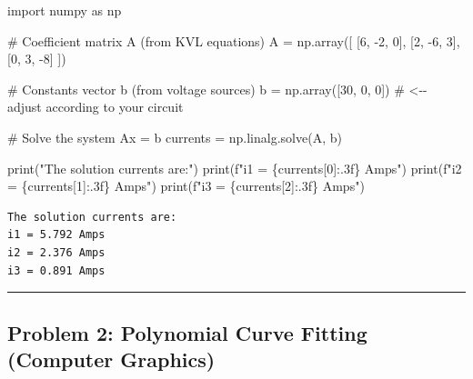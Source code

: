 \documentclass[
  letterpaper,
  DIV=11,
  numbers=noendperiod]{scrreprt}
\newenvironment{Shaded}{\begin{snugshade}}{\end{snugshade}}
\newcommand{\BuiltInTok}[1]{\textcolor[rgb]{0.00,0.23,0.31}{#1}}
\newcommand{\CommentTok}[1]{\textcolor[rgb]{0.37,0.37,0.37}{#1}}
\newcommand{\DecValTok}[1]{\textcolor[rgb]{0.68,0.00,0.00}{#1}}
\newcommand{\ImportTok}[1]{\textcolor[rgb]{0.00,0.46,0.62}{#1}}
\newcommand{\NormalTok}[1]{\textcolor[rgb]{0.00,0.23,0.31}{#1}}
\newcommand{\OperatorTok}[1]{\textcolor[rgb]{0.37,0.37,0.37}{#1}}
\newcommand{\SpecialCharTok}[1]{\textcolor[rgb]{0.37,0.37,0.37}{#1}}
\newcommand{\SpecialStringTok}[1]{\textcolor[rgb]{0.13,0.47,0.30}{#1}}
\newcommand{\StringTok}[1]{\textcolor[rgb]{0.13,0.47,0.30}{#1}}
\begin{document}
\label{solve-circuit}
\begin{Shaded}
\begin{Highlighting}[]
\ImportTok{import}\NormalTok{ numpy }\ImportTok{as}\NormalTok{ np}

\CommentTok{\# Coefficient matrix A (from KVL equations)}
\NormalTok{A }\OperatorTok{=}\NormalTok{ np.array([}
\NormalTok{    [}\DecValTok{6}\NormalTok{, }\OperatorTok{{-}}\DecValTok{2}\NormalTok{, }\DecValTok{0}\NormalTok{],}
\NormalTok{    [}\DecValTok{2}\NormalTok{, }\OperatorTok{{-}}\DecValTok{6}\NormalTok{, }\DecValTok{3}\NormalTok{],}
\NormalTok{    [}\DecValTok{0}\NormalTok{, }\DecValTok{3}\NormalTok{, }\OperatorTok{{-}}\DecValTok{8}\NormalTok{]}
\NormalTok{])}

\CommentTok{\# Constants vector b (from voltage sources)}
\NormalTok{b }\OperatorTok{=}\NormalTok{ np.array([}\DecValTok{30}\NormalTok{, }\DecValTok{0}\NormalTok{, }\DecValTok{0}\NormalTok{])   }\CommentTok{\# \textless{}{-}{-} adjust according to your circuit}

\CommentTok{\# Solve the system Ax = b}
\NormalTok{currents }\OperatorTok{=}\NormalTok{ np.linalg.solve(A, b)}

\BuiltInTok{print}\NormalTok{(}\StringTok{"The solution currents are:"}\NormalTok{)}
\BuiltInTok{print}\NormalTok{(}\SpecialStringTok{f"i1 = }\SpecialCharTok{\{}\NormalTok{currents[}\DecValTok{0}\NormalTok{]}\SpecialCharTok{:.3f\}}\SpecialStringTok{ Amps"}\NormalTok{)}
\BuiltInTok{print}\NormalTok{(}\SpecialStringTok{f"i2 = }\SpecialCharTok{\{}\NormalTok{currents[}\DecValTok{1}\NormalTok{]}\SpecialCharTok{:.3f\}}\SpecialStringTok{ Amps"}\NormalTok{)}
\BuiltInTok{print}\NormalTok{(}\SpecialStringTok{f"i3 = }\SpecialCharTok{\{}\NormalTok{currents[}\DecValTok{2}\NormalTok{]}\SpecialCharTok{:.3f\}}\SpecialStringTok{ Amps"}\NormalTok{)}
\end{Highlighting}
\end{Shaded}

\begin{verbatim}
The solution currents are:
i1 = 5.792 Amps
i2 = 2.376 Amps
i3 = 0.891 Amps
\end{verbatim}

\begin{center}\rule{0.5\linewidth}{0.5pt}\end{center}

\subsection{Problem 2: Polynomial Curve Fitting (Computer
Graphics)}\label{problem-2-polynomial-curve-fitting-computer-graphics}
\end{document}
